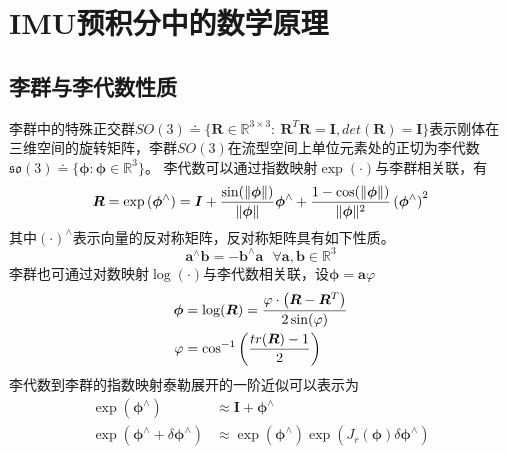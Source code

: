 


\chapter{IMU预积分中的数学原理}

\section{李群与李代数性质}

李群中的特殊正交群$SO(3) \doteq \{ \boldsymbol{R} \in \mathds{R}^{3 \times 3}:\ \boldsymbol{R}^T \boldsymbol{R}=\boldsymbol{I},det(\boldsymbol{R})=\boldsymbol{I} \}$表示刚体在三维空间的旋转矩阵，李群$SO(3)$在流型空间上单位元素处的正切为李代数$\mathfrak{so}(3) \doteq \{ \boldsymbol{\phi}: \boldsymbol{\phi} \in  \mathds{R}^3  \}$。
李代数可以通过指数映射$\exp(\cdot)$与李群相关联，有
\begin{equation}
\label{equ1}
\boldsymbol{R} = \exp \left( \boldsymbol{\phi}^\wedge \right) = \boldsymbol{I}+{ \sin( \Vert \boldsymbol{\phi} \Vert) \over \Vert \boldsymbol{\phi} \Vert } \boldsymbol{\phi}^{\wedge} + { {1-\cos(\Vert \boldsymbol{\phi} \Vert)} \over \Vert \boldsymbol{\phi} \Vert^2 }\left(\boldsymbol{\phi}^{\wedge}\right)^2
\end{equation}
其中$(\cdot)^\wedge$表示向量的反对称矩阵，反对称矩阵具有如下性质。
\begin{equation}
\boldsymbol{a}^\wedge \boldsymbol{b} = - \boldsymbol{b}^\wedge \boldsymbol{a} \ \ \ \forall \boldsymbol{a},\boldsymbol{b} \in \mathds{R}^3
\end{equation}
李群也可通过对数映射$\log(\cdot)$与李代数相关联，设$\boldsymbol{\phi} = \boldsymbol{a} \varphi$
\begin{equation}
\label{equ2}
\begin{aligned}
\boldsymbol{\phi} &= \log(\boldsymbol{R}) = { \varphi \cdot \left(\boldsymbol{R} - \boldsymbol{R}^T \right)  \over 2 \sin(\varphi) }
\\
\varphi &= \cos^{-1} \left( tr(\boldsymbol{R})-1 \over 2 \right)
\end{aligned}
\end{equation}
李代数到李群的指数映射泰勒展开的一阶近似可以表示为
\begin{equation}
\label{equ3}
\begin{aligned}
\exp\left( \boldsymbol{\phi}^{\wedge} \right) & \approx  \boldsymbol{I} + \boldsymbol{\phi}^{\wedge}
\\
\exp\left( \boldsymbol{\phi}^{\wedge} + \delta\boldsymbol{\phi}^{\wedge}  \right) & \approx \exp \left( \boldsymbol{\phi}^{\wedge} \right)  \exp \left( J_r\left( \boldsymbol{\phi} \right) \delta\boldsymbol{\phi}^{\wedge} \right)
\end{aligned}
\end{equation}

